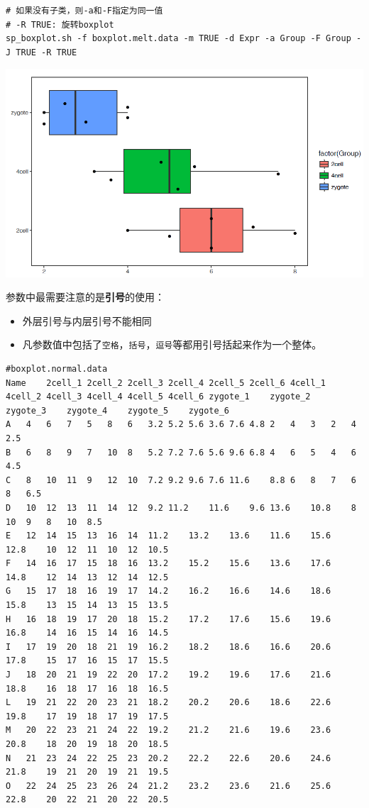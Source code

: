 \documentclass[]{article}
\providecommand{\tightlist}{%
  \setlength{\itemsep}{0pt}\setlength{\parskip}{0pt}}
\numberwithin{figure}{section}
\numberwithin{table}{section}
\theoremstyle{definition}
\theoremstyle{definition}
\theoremstyle{definition}
\theoremstyle{remark}
\begin{document}
\begin{verbatim}
# 如果没有子类，则-a和-F指定为同一值
# -R TRUE: 旋转boxplot
sp_boxplot.sh -f boxplot.melt.data -m TRUE -d Expr -a Group -F Group -J TRUE -R TRUE
\end{verbatim}

\begin{center}\includegraphics[width=0.95\linewidth,height=0.7\textheight,keepaspectratio]{images/boxplot_10} \end{center}

参数中最需要注意的是\textbf{引号}的使用：

\begin{itemize}
\tightlist
\item
  外层引号与内层引号不能相同
\item
  凡参数值中包括了\texttt{空格}，\texttt{括号}，\texttt{逗号}等都用引号括起来作为一个整体。
\end{itemize}

\begin{verbatim}
#boxplot.normal.data
Name    2cell_1 2cell_2 2cell_3 2cell_4 2cell_5 2cell_6 4cell_1 4cell_2 4cell_3 4cell_4 4cell_5 4cell_6 zygote_1    zygote_2    zygote_3    zygote_4    zygote_5    zygote_6
A   4   6   7   5   8   6   3.2 5.2 5.6 3.6 7.6 4.8 2   4   3   2   4   2.5
B   6   8   9   7   10  8   5.2 7.2 7.6 5.6 9.6 6.8 4   6   5   4   6   4.5
C   8   10  11  9   12  10  7.2 9.2 9.6 7.6 11.6    8.8 6   8   7   6   8   6.5
D   10  12  13  11  14  12  9.2 11.2    11.6    9.6 13.6    10.8    8   10  9   8   10  8.5
E   12  14  15  13  16  14  11.2    13.2    13.6    11.6    15.6    12.8    10  12  11  10  12  10.5
F   14  16  17  15  18  16  13.2    15.2    15.6    13.6    17.6    14.8    12  14  13  12  14  12.5
G   15  17  18  16  19  17  14.2    16.2    16.6    14.6    18.6    15.8    13  15  14  13  15  13.5
H   16  18  19  17  20  18  15.2    17.2    17.6    15.6    19.6    16.8    14  16  15  14  16  14.5
I   17  19  20  18  21  19  16.2    18.2    18.6    16.6    20.6    17.8    15  17  16  15  17  15.5
J   18  20  21  19  22  20  17.2    19.2    19.6    17.6    21.6    18.8    16  18  17  16  18  16.5
L   19  21  22  20  23  21  18.2    20.2    20.6    18.6    22.6    19.8    17  19  18  17  19  17.5
M   20  22  23  21  24  22  19.2    21.2    21.6    19.6    23.6    20.8    18  20  19  18  20  18.5
N   21  23  24  22  25  23  20.2    22.2    22.6    20.6    24.6    21.8    19  21  20  19  21  19.5
O   22  24  25  23  26  24  21.2    23.2    23.6    21.6    25.6    22.8    20  22  21  20  22  20.5
\end{verbatim}
\end{document}

